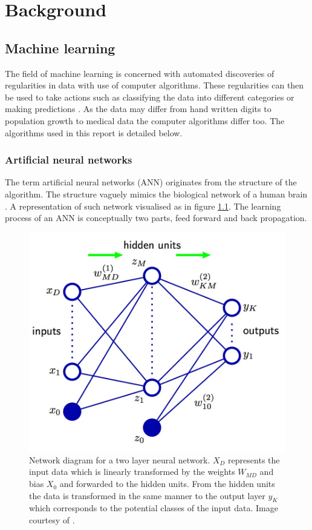 \chapter{Background}


\section{Machine learning}

The field of machine learning is concerned with automated discoveries of regularities in data with use of computer algorithms. These regularities can then be used to take actions such as classifying the data into different categories or making predictions \parencite{Bishop:2006}. As the data may differ from hand written digits to population growth to medical data the computer algorithms differ too. The algorithms used in this report is detailed below.

\subsection{Artificial neural networks}

The term artificial neural networks (ANN) originates from the structure of the algorithm. The structure vaguely mimics the biological network of a human brain \parencite{Bishop:2006}. A representation of such network visualised as in figure \ref{fig:ANN_representation}. The learning process of an ANN is conceptually two parts, feed forward and back propagation.

\begin{figure}[ht!]
  \centering
  \includegraphics[width=0.7\linewidth]{images/ANN_representation.jpg}
  \caption[]
  {\small Network diagram for a two layer neural network. $X_D$ represents the input data which is linearly transformed by the weights $W_{MD}$ and bias $X_0$ and forwarded to the hidden units. From the hidden units the data is transformed in the same manner to the output layer $y_K$ which corresponds to the potential classes of the input data. Image courtesy of \textcite{Bishop:2006}.}
  \label{fig:ANN_representation}
\end{figure}

